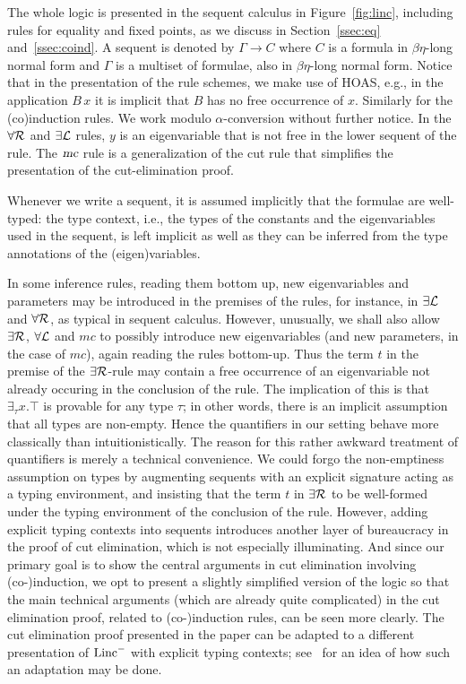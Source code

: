 \documentclass[preprint]{elsarticle}
\newcommand{\Linc}{{\rm Linc}^-}
\newcommand{\Seq}[2]{#1\longrightarrow #2}
\newcommand{\existsL}{\exists{\cal L}}
\newcommand{\existsR}{\exists{\cal R}}
\newcommand{\forallL}{\forall{\cal L}}
\newcommand{\forallR}{\forall{\cal R}}
\newcommand{\mc}{\hbox{\sl mc}}
\begin{document}
The whole logic is presented in the sequent calculus in
Figure~\ref{fig:linc}, including rules for equality and fixed points,
as we discuss in Section~\ref{ssec:eq} and~\ref{ssec:coind}. A sequent
is denoted by $\Seq{\Gamma}{C}$ where $C$ is a formula in
$\beta\eta$-long normal form and $\Gamma$ is a multiset of formulae,
also in $\beta\eta$-long normal form.  Notice that in the presentation
of the rule schemes, we make use of HOAS, e.g., in the application
$B\,x$ it is implicit that $B$ has no free occurrence of
$x$. Similarly for the (co)induction rules.  We work modulo $\alpha$-conversion without further notice.  In the
$\forallR$ and $\existsL$ rules, $y$ is an eigenvariable that is not
free in the lower sequent of the rule.  The $\mc$ rule is a
generalization of the cut rule that simplifies the presentation of the
cut-elimination proof.

Whenever we write a sequent, it is assumed implicitly that the
formulae are well-typed: the type
context, i.e., the types of the constants and the eigenvariables used
in the sequent, is left implicit as well as they can be inferred
from the type annotations of the (eigen)variables.



In some inference rules, reading them bottom up, new eigenvariables
and parameters may be introduced in the premises of the rules, for
instance, in $\existsL$ and $\forallR$, as typical in sequent
calculus.  However, unusually, we shall also allow $\existsR$,
$\forallL$ and $mc$ to possibly introduce new eigenvariables (and new
parameters, in the case of $mc$), again reading the rules bottom-up.
Thus the term $t$ in the premise of the $\existsR$-rule may contain a
free occurrence of an eigenvariable not already occuring in the
conclusion of the rule. The implication of this is that $\exists_\tau
x. \top$ is provable for any type $\tau$; in other words, there is an
implicit assumption that all types are non-empty. Hence the
quantifiers in our setting behave more classically than
intuitionistically.
The reason for this rather awkward treatment of quantifiers is merely
a technical convenience. We could forgo the non-emptiness assumption
on types by augmenting sequents with an explicit signature acting as a
typing environment, and insisting that the term $t$ in $\existsR$ to
be well-formed under the typing environment of the conclusion of the
rule.  However, adding explicit typing contexts into sequents
introduces another layer of bureaucracy in the proof of cut
elimination, which is not especially illuminating. And since our
primary goal is to show the central arguments in cut elimination
involving (co-)induction, we opt to present a slightly simplified
version of the logic so that the main technical arguments (which are
already quite complicated) in the cut elimination proof, related to
(co-)induction rules, can be seen more clearly.  The cut elimination
proof presented in the paper can be adapted to a different
presentation of $\Linc$ with explicit typing contexts;
see~\cite{tiu04phd,Tiu07} for an idea of how such an adaptation may be
done.
\end{document}
